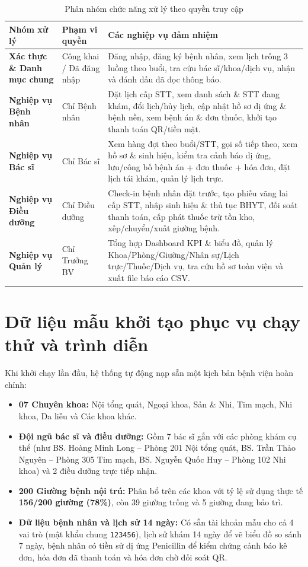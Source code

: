 \documentclass[12pt,a4paper]{report}
\begin{document}
\begin{table}[H]
  \centering
  \caption{Phân nhóm chức năng xử lý theo quyền truy cập}
  \begin{tabularx}{\textwidth}{@{}p{3.8cm} p{2.8cm} X@{}}
    \toprule
    \textbf{Nhóm xử lý} & \textbf{Phạm vi quyền} & \textbf{Các nghiệp vụ đảm nhiệm} \\
    \midrule
    \textbf{Xác thực \& Danh mục chung} & Công khai / Đã đăng nhập & Đăng nhập, đăng ký bệnh nhân, xem lịch trống 3 luồng theo buổi, tra cứu bác sĩ/khoa/dịch vụ, nhận và đánh dấu đã đọc thông báo. \\
    \textbf{Nghiệp vụ Bệnh nhân} & Chỉ Bệnh nhân & Đặt lịch cấp STT, xem danh sách \& STT đang khám, đổi lịch/hủy lịch, cập nhật hồ sơ dị ứng \& bệnh nền, xem bệnh án \& đơn thuốc, khởi tạo thanh toán QR/tiền mặt. \\
    \textbf{Nghiệp vụ Bác sĩ} & Chỉ Bác sĩ & Xem hàng đợi theo buổi/STT, gọi số tiếp theo, xem hồ sơ \& sinh hiệu, kiểm tra cảnh báo dị ứng, lưu/công bố bệnh án + đơn thuốc + hóa đơn, đặt lịch tái khám, quản lý lịch trực. \\
    \textbf{Nghiệp vụ Điều dưỡng} & Chỉ Điều dưỡng & Check-in bệnh nhân đặt trước, tạo phiếu vãng lai cấp STT, nhập sinh hiệu \& thủ tục BHYT, đối soát thanh toán, cấp phát thuốc trừ tồn kho, xếp/chuyển/xuất giường bệnh. \\
    \textbf{Nghiệp vụ Quản lý} & Chỉ Trưởng BV & Tổng hợp Dashboard KPI \& biểu đồ, quản lý Khoa/Phòng/Giường/Nhân sự/Lịch trực/Thuốc/Dịch vụ, tra cứu hồ sơ toàn viện và xuất file báo cáo CSV. \\
    \bottomrule
  \end{tabularx}
\end{table}

\section{Dữ liệu mẫu khởi tạo phục vụ chạy thử và trình diễn}
Khi khởi chạy lần đầu, hệ thống tự động nạp sẵn một kịch bản bệnh viện hoàn chỉnh:
\begin{itemize}
  \item \textbf{07 Chuyên khoa:} Nội tổng quát, Ngoại khoa, Sản \& Nhi, Tim mạch, Nhi khoa, Da liễu và Các khoa khác.
  \item \textbf{Đội ngũ bác sĩ và điều dưỡng:} Gồm 7 bác sĩ gắn với các phòng khám cụ thể (như BS. Hoàng Minh Long -- Phòng 201 Nội tổng quát, BS. Trần Thảo Nguyên -- Phòng 305 Tim mạch, BS. Nguyễn Quốc Huy -- Phòng 102 Nhi khoa) và 2 điều dưỡng trực tiếp nhận.
  \item \textbf{200 Giường bệnh nội trú:} Phân bổ trên các khoa với tỷ lệ sử dụng thực tế \textbf{156/200 giường (78\%)}, còn 39 giường trống và 5 giường đang bảo trì.
  \item \textbf{Dữ liệu bệnh nhân và lịch sử 14 ngày:} Có sẵn tài khoản mẫu cho cả 4 vai trò (mật khẩu chung \texttt{123456}), lịch sử khám 14 ngày để vẽ biểu đồ so sánh 7 ngày, bệnh nhân có tiền sử dị ứng Penicillin để kiểm chứng cảnh báo kê đơn, hóa đơn đã thanh toán và hóa đơn chờ đối soát QR.
\end{itemize}
\end{document}
